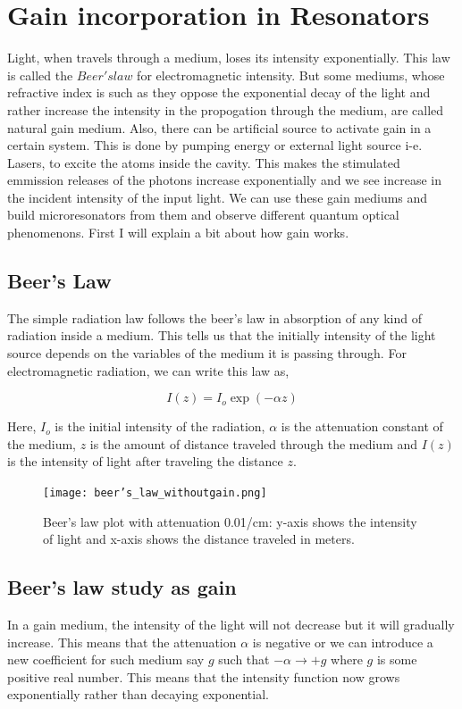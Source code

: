 \section{Gain incorporation in Resonators}
Light, when travels through a medium, loses its intensity exponentially. This law is called the $Beer's law$ for electromagnetic intensity. But some mediums, whose refractive index is such as they oppose the exponential decay of the light and rather increase the intensity in the propogation through the medium, are called natural gain medium. Also, there can be artificial source to activate gain in a certain system. This is done by pumping energy or external light source i-e. Lasers, to excite the atoms inside the cavity. This makes the stimulated emmission releases of the photons increase exponentially and we see increase in the incident intensity of the input light. We can use these gain mediums and build microresonators from them and observe different quantum optical phenomenons. First I will explain a bit about how gain works.


\subsection{Beer's Law}
The simple radiation law follows the beer's law in absorption of any kind of radiation inside a medium. This tells us that the initially intensity of the light source depends on the variables of the medium it is passing through. For electromagnetic radiation, we can write this law as,

\begin{equation}
I(z) = I_{o}\exp(-\alpha z)
\end{equation}

Here, $I_{o}$ is the initial intensity of the radiation, $\alpha$ is the attenuation constant of the medium, $z$ is the amount of distance traveled through the medium and $I(z)$ is the intensity of light after traveling the distance $z$.

\begin{figure}[h]
\centering
\texttt{[image: beer's\_law\_withoutgain.png]}
\caption{Beer's law plot with attenuation 0.01/cm: y-axis shows the intensity of light and x-axis shows the distance traveled in meters.}
\end{figure}


\subsection{Beer's law study as gain}
In a gain medium, the intensity of the light will not decrease but it will gradually increase. This means that the attenuation $\alpha$ is negative or we can introduce a new coefficient for such medium say $g$ such that $-\alpha \to +g$ where $g$ is some positive real number. This means that the intensity function now grows exponentially rather than decaying exponential.

